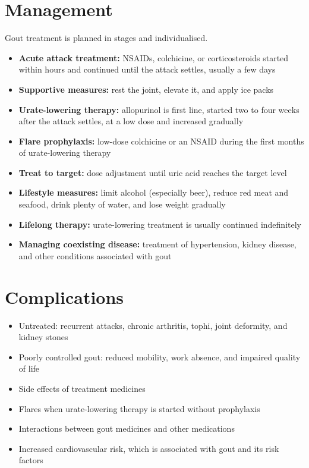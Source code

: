 \section*{Management}
Gout treatment is planned in stages and individualised.

\begin{itemize}
    \item \textbf{Acute attack treatment:} NSAIDs, colchicine, or corticosteroids started within hours and continued until the attack settles, usually a few days
    \item \textbf{Supportive measures:} rest the joint, elevate it, and apply ice packs
    \item \textbf{Urate-lowering therapy:} allopurinol is first line, started two to four weeks after the attack settles, at a low dose and increased gradually
    \item \textbf{Flare prophylaxis:} low-dose colchicine or an NSAID during the first months of urate-lowering therapy
    \item \textbf{Treat to target:} dose adjustment until uric acid reaches the target level
    \item \textbf{Lifestyle measures:} limit alcohol (especially beer), reduce red meat and seafood, drink plenty of water, and lose weight gradually
    \item \textbf{Lifelong therapy:} urate-lowering treatment is usually continued indefinitely
    \item \textbf{Managing coexisting disease:} treatment of hypertension, kidney disease, and other conditions associated with gout
\end{itemize}

\section*{Complications}
\begin{itemize}
    \item Untreated: recurrent attacks, chronic arthritis, tophi, joint deformity, and kidney stones
    \item Poorly controlled gout: reduced mobility, work absence, and impaired quality of life
    \item Side effects of treatment medicines
    \item Flares when urate-lowering therapy is started without prophylaxis
    \item Interactions between gout medicines and other medications
    \item Increased cardiovascular risk, which is associated with gout and its risk factors
\end{itemize}

